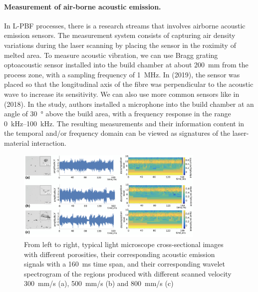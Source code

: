 \paragraph{Measurement of air-borne acoustic emission.} In L-PBF processes, there is a research streams that involves airborne acoustic emission sensors. The measurement system consists of capturing air density variations during the laser scanning by placing the sensor in the roximity of melted area. To measure acoustic vibration, we can use Bragg grating optoacoustic sensor installed into the build chamber at about \SI{200}{\milli\metre} from the process zone, with a sampling frequency of \SI{1}{\mega\hertz}. In \citeauthor{wasmer_situ_2019} (2019), the sensor was placed so that the longitudinal axis of the fibre was perpendicular to the acoustic wave to increase its sensitivity. We can also use more common sensors like in \citeauthor{ye_defect_2018} (2018). In the study, authors installed a microphone into the build chamber at an angle of \SI{30}{\degree} above the build area, with a frequency response in the range \SIrange[range-phrase=--]{0}{100}{\kilo\hertz}. The resulting measurements and their information content in the temporal and/or frequency domain can be viewed as signatures of the laser-material interaction.
\begin{figure}
    \centering
    \includegraphics[width = 0.8\textwidth]{Images/acustic.png}
    \caption[Example of AE of different porosities specimens.] {From left to right, typical light microscope cross-sectional images with different porosities, their corresponding acoustic emission signals with a \SI{160}{\milli\second} time span, and their corresponding wavelet spectrogram of the regions produced with different scanned velocity \SI{300}{\milli\metre / \second} (a), \SI{500}{\milli\metre / \second} (b) and \SI{800}{\milli\metre /\second} (c) \cite{wasmer_situ_2019}}
    \label{fig:acustic}
\end{figure}



